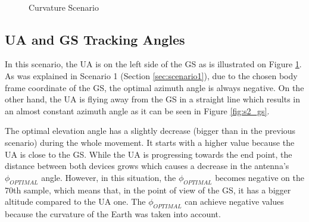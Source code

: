\begin{figure}[H]
	\\
	\hfill
	\caption{Curvature Scenario}
	\label{fig:s2_map}
\end{figure}


\subsection*{UA and GS Tracking Angles}
In this scenario, the UA is on the left side of the GS as is illustrated on Figure \ref{fig:s2_map}. As was explained in Scenario 1 (Section \ref{sec:scenario1}), due to the chosen body frame coordinate of the GS, the optimal azimuth angle is always negative. On the other hand, the UA is flying away from the GS in a straight line which results in an almost constant azimuth angle as it can be seen in Figure \ref{fig:s2_gs}. 

The optimal elevation angle has a slightly decrease (bigger than in the previous scenario) during the whole movement. It starts with a higher value because the UA is close to the GS. While the UA is progressing towards the end point, the distance between both devices grows which causes a decrease in the antenna's $\phi_{OPTIMAL}$ angle. However, in this situation, the $\phi_{OPTIMAL}$ becomes negative on the 70th sample, which means that, in the point of view of the GS, it has a bigger altitude compared to the UA one. The $\phi_{OPTIMAL}$ can achieve negative values because the curvature of the Earth was taken into account.

